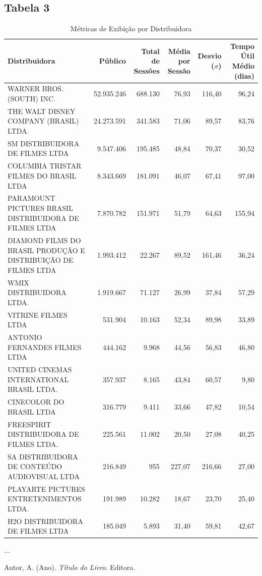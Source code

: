 \documentclass{article}
\begin{document}
\begin{landscape}
\subsection*{Tabela 3}
\begin{table}[H]
\centering
\small
\caption{Métricas de Exibição por Distribuidora}
\begin{tabular}{p{5cm}rrrrr}
\hline
\textbf{Distribuidora} & \textbf{Público} & \textbf{Total de Sessões} & \textbf{Média por Sessão} & \textbf{Desvio ($\sigma$)} & \textbf{Tempo Útil Médio (dias)} \\
\hline
WARNER BROS. (SOUTH) INC. & 52.935.246 & 688.130 & 76,93 & 116,40 & 96,24 \\
THE WALT DISNEY COMPANY (BRASIL) LTDA. & 24.273.591 & 341.583 & 71,06 & 89,57 & 83,76 \\
SM DISTRIBUIDORA DE FILMES LTDA & 9.547.406 & 195.485 & 48,84 & 70,37 & 30,52 \\
COLUMBIA TRISTAR FILMES DO BRASIL LTDA & 8.343.669 & 181.091 & 46,07 & 67,41 & 97,00 \\
PARAMOUNT PICTURES BRASIL DISTRIBUIDORA DE FILMES LTDA & 7.870.782 & 151.971 & 51,79 & 64,63 & 155,94 \\
DIAMOND FILMS DO BRASIL PRODUÇÃO E DISTRIBUIÇÃO DE FILMES LTDA & 1.993.412 & 22.267 & 89,52 & 161,46 & 36,24 \\
WMIX DISTRIBUIDORA LTDA. & 1.919.667 & 71.127 & 26,99 & 37,84 & 57,29 \\
VITRINE FILMES LTDA & 531.904 & 10.163 & 52,34 & 89,98 & 33,89 \\
ANTONIO FERNANDES FILMES LTDA & 444.162 & 9.968 & 44,56 & 56,83 & 46,80 \\
UNITED CINEMAS INTERNATIONAL BRASIL LTDA. & 357.937 & 8.165 & 43,84 & 60,57 & 9,80 \\
CINECOLOR DO BRASIL LTDA & 316.779 & 9.411 & 33,66 & 47,82 & 10,54 \\
FREESPIRIT DISTRIBUIDORA DE FILMES LTDA. & 225.561 & 11.002 & 20,50 & 27,08 & 40,25 \\
SA DISTRIBUIDORA DE CONTEÚDO AUDIOVISUAL LTDA & 216.849 & 955 & 227,07 & 216,66 & 27,00 \\
PLAYARTE PICTURES ENTRETENIMENTOS LTDA. & 191.989 & 10.282 & 18,67 & 23,70 & 25,40 \\
H2O DISTRIBUIDORA DE FILMES LTDA & 185.049 & 5.893 & 31,40 & 59,81 & 42,67 \\





\end{tabular}
\begin{center}
$\ldots$
\end{center}
\end{table}
\end{landscape}


\lipsum[1] %


\begin{thebibliography}{99}

Autor, A. (Ano). \textit{Título do Livro}. Editora.

\end{thebibliography}
\end{document}
